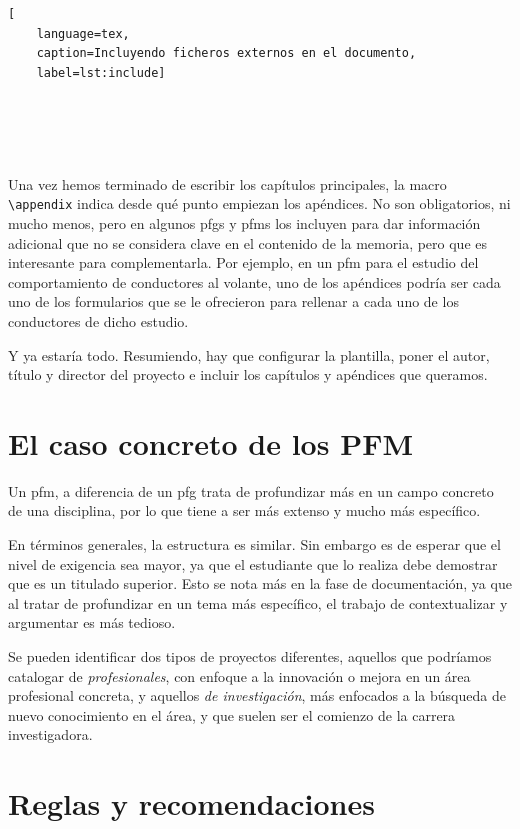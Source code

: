 \documentclass[%
    school=etsisi,%
    type=pfg,%
    degree=61CD,%
]{upm-report}
\begin{document}
\begin{lstlisting}[
    language=tex,
    caption=Incluyendo ficheros externos en el documento,
    label=lst:include]





\end{lstlisting}

Una vez hemos terminado de escribir los capítulos principales, la macro
\lstinline{\appendix} indica desde qué punto empiezan los apéndices. No
son obligatorios, ni mucho menos, pero en algunos \glspl{pfg} y
\glspl{pfm} los incluyen para dar información adicional que no se
considera clave en el contenido de la memoria, pero que es interesante
para complementarla. Por ejemplo, en un \gls{pfm} para el estudio del
comportamiento de conductores al volante, uno de los apéndices podría
ser cada uno de los formularios que se le ofrecieron para rellenar a
cada uno de los conductores de dicho estudio.

Y ya estaría todo. Resumiendo, hay que configurar la plantilla, poner
el autor, título y director del proyecto e incluir los capítulos y
apéndices que queramos.

\section{El caso concreto de los PFM}

Un \gls{pfm}, a diferencia de un \gls{pfg} trata de profundizar más en
un campo concreto de una disciplina, por lo que tiene a ser más extenso
y mucho más específico.

En términos generales, la estructura es similar. Sin embargo es de
esperar que el nivel de exigencia sea mayor, ya que el estudiante que
lo realiza debe demostrar que es un titulado superior. Esto se nota más
en la fase de documentación, ya que al tratar de profundizar en un tema
más específico, el trabajo de contextualizar y argumentar es más
tedioso.

Se pueden identificar dos tipos de proyectos diferentes, aquellos que
podríamos catalogar de \textit{profesionales}, con enfoque a la
innovación o mejora en un área profesional concreta, y aquellos
\textit{de investigación}, más enfocados a la búsqueda de nuevo
conocimiento en el área, y que suelen ser el comienzo de la carrera
investigadora.

\section{Reglas y recomendaciones}
\end{document}
